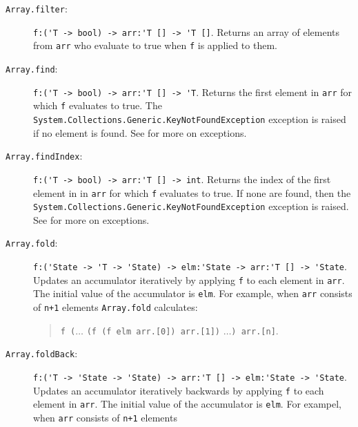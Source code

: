 \documentclass[fsharpnotes.tex]{subfiles}
\begin{document}
\begin{description}
\item[\texttt{Array.filter}:] \lstinline{f:('T -> bool) -> arr:'T [] -> 'T []}. Returns an array of elements from \lstinline{arr} who evaluate to true when \lstinline{f} is applied to them.
\item[\texttt{Array.find}:] \lstinline{f:('T -> bool) -> arr:'T [] -> 'T}. Returns the first element in \lstinline{arr} for which \lstinline{f} evaluates to true. The \lstinline{System.Collections.Generic.KeyNotFoundException} exception is raised if no element is found.  See  for more on exceptions.
    
\item[\texttt{Array.findIndex}:] \lstinline{f:('T -> bool) -> arr:'T [] -> int}. Returns the index of the first element in in \lstinline{arr} for which \lstinline{f} evaluates to true. If none are found, then the \lstinline{System.Collections.Generic.KeyNotFoundException} exception is raised.  See  for more on exceptions.
\item[\texttt{Array.fold}:] \lstinline{f:('State -> 'T -> 'State) -> elm:'State -> arr:'T [] -> 'State}. Updates an accumulator iteratively by applying \lstinline{f} to each element in \lstinline{arr}. The initial value of the accumulator is \lstinline{elm}. For example, when \lstinline{arr} consists of \lstinline{n+1} elements
  \lstinline{Array.fold} calculates:
  \begin{quote}
    \lstinline{f (}$\ldots$ \lstinline{(f (f elm arr.[0]) arr.[1])} $\ldots$\lstinline{) arr.[n]}.
  \end{quote}
\item[\texttt{Array.foldBack}:] \lstinline{f:('T -> 'State -> 'State) -> arr:'T [] -> elm:'State -> 'State}. Updates an accumulator iteratively backwards by applying \lstinline{f} to each element in \lstinline{arr}. The initial value of the accumulator is \lstinline{elm}. For exampel, when \lstinline{arr} consists of \lstinline{n+1} elements

\end{description}
\end{document}
